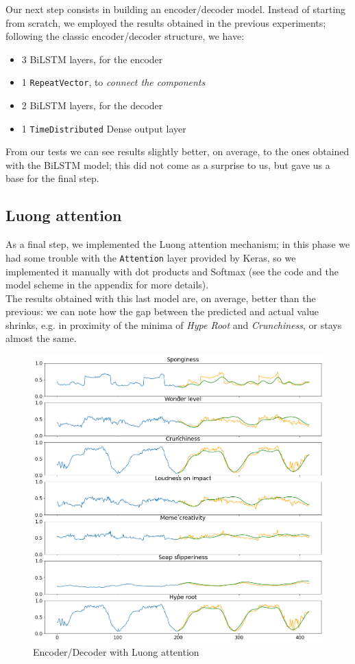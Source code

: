 \documentclass[10.5pt,a4paper,twocolumn]{article}
\begin{document}
Our next step consists in building an encoder/decoder model. Instead of starting from 
scratch, we employed the results obtained in the previous experiments; following the
classic encoder/decoder structure, we have:
\begin{itemize}
    \item 3 BiLSTM layers, for the encoder
    \item 1 \texttt{RepeatVector}, to \textit{connect the components}
    \item 2 BiLSTM layers, for the decoder
    \item 1 \texttt{TimeDistributed} Dense output layer
\end{itemize}

From our tests we can see results slightly better, on average, to the ones obtained with the 
BiLSTM model; this did not come as a surprise to us, but gave us a base for the final step.

\subsection{Luong attention}
As a final step, we implemented the Luong attention mechanism; in this phase we had
some trouble with the \texttt{Attention} layer provided by Keras, so we implemented
it manually with dot products and Softmax (see the code and the model scheme in the appendix for more details).\\

The results obtained with this last model are, on average, better than the previous:
we can note how the gap between the predicted and actual value shrinks, e.g. in 
proximity of the minima of \textit{Hype Root} and \textit{Crunchiness}, or stays
almost the same.


\begin{figure}[h]
    \centering
    \includegraphics[width=\linewidth]{pics/pred_attention.png}
    \caption{Encoder/Decoder with Luong attention}
\end{figure}
\end{document}
